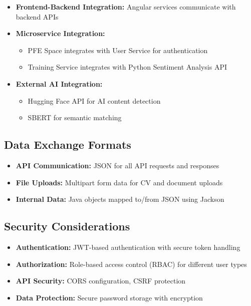 \documentclass[12pt,a4paper]{report}
\begin{document}
\begin{itemize}
    \item \textbf{Frontend-Backend Integration:} Angular services communicate with backend APIs

    \item \textbf{Microservice Integration:}
    \begin{itemize}
        \item PFE Space integrates with User Service for authentication
        \item Training Service integrates with Python Sentiment Analysis API
    \end{itemize}

    \item \textbf{External AI Integration:}
    \begin{itemize}
        \item Hugging Face API for AI content detection
        \item SBERT for semantic matching
    \end{itemize}
\end{itemize}

\subsection{Data Exchange Formats}

\begin{itemize}
    \item \textbf{API Communication:} JSON for all API requests and responses
    \item \textbf{File Uploads:} Multipart form data for CV and document uploads
    \item \textbf{Internal Data:} Java objects mapped to/from JSON using Jackson
\end{itemize}

\subsection{Security Considerations}

\begin{itemize}
    \item \textbf{Authentication:} JWT-based authentication with secure token handling
    \item \textbf{Authorization:} Role-based access control (RBAC) for different user types
    \item \textbf{API Security:} CORS configuration, CSRF protection
    \item \textbf{Data Protection:} Secure password storage with encryption
\end{itemize}
\end{document}
